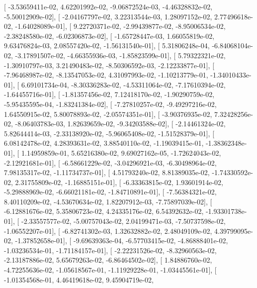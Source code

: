 \documentclass{article}
\begin{document}
       [ -3.53659411e-02,   4.62201992e-02,  -9.06872524e-03,
         -4.46328832e-02,  -5.50012909e-02],
       [ -2.04167797e-02,   3.22313544e-03,   1.28097152e-02,
          2.77496618e-02,  -1.64028089e-01],
       [  9.22720371e-02,  -2.99439877e-02,  -8.95006534e-02,
         -2.38248580e-02,  -6.02306873e-02],
       [ -1.65728447e-03,   1.66055819e-02,   9.63476824e-03,
          2.08557420e-02,  -1.56131540e-01],
       [  5.31806248e-04,  -6.84068104e-02,  -3.17891507e-02,
         -4.66355936e-03,  -1.85823599e-01],
       [  5.79322321e-02,  -1.30910797e-03,   3.21490483e-02,
         -8.50306592e-03,  -2.12233877e-01],
       [ -7.96468987e-02,  -8.13547053e-02,   4.31097993e-02,
         -1.10213779e-01,  -1.34010433e-01],
       [  6.69101734e-04,  -8.30336283e-02,  -4.53311064e-02,
         -7.17610394e-02,  -1.64455716e-01],
       [ -1.81357456e-02,   7.12418170e-02,  -1.90290759e-02,
         -5.95435595e-04,  -1.83241384e-02],
       [ -7.27810257e-02,  -9.49297216e-02,   1.64550915e-02,
          5.80078893e-02,  -2.05574351e-01],
       [ -3.90376935e-02,   7.32428256e-02,  -8.06403783e-03,
          1.82639659e-02,  -9.34203588e-02],
       [ -2.14461324e-02,   5.82644414e-03,  -2.33138920e-02,
         -5.96065408e-02,  -1.51528379e-01],
       [  6.08142478e-02,   4.28393631e-02,   3.88540110e-02,
         -1.19039415e-01,  -1.38362348e-01],
       [  1.14959859e-01,   5.65216380e-02,   9.69027162e-05,
         -1.72624043e-02,  -2.12921681e-01],
       [ -6.58661229e-02,  -3.04296921e-03,  -6.30498964e-02,
          7.98135317e-02,  -1.11734737e-01],
       [  4.51793240e-02,   8.81389035e-02,  -1.74330592e-02,
          2.31755809e-02,  -1.16885151e-01],
       [ -6.33363815e-02,   1.93601914e-02,  -5.29888969e-02,
         -6.66021181e-02,  -1.84710891e-01],
       [ -7.56384321e-02,   8.40110209e-02,  -4.53670634e-02,
          1.82207912e-03,  -7.75897039e-02],
       [ -6.12881676e-02,   5.35806723e-02,   4.24335176e-02,
          6.54392632e-02,  -1.93301738e-01],
       [ -2.33557577e-02,  -5.00757043e-02,   2.04199471e-03,
         -7.50737598e-02,  -1.06552207e-01],
       [ -6.82741302e-03,   1.32632882e-02,   2.48049109e-02,
          4.39799095e-02,  -1.37852658e-01],
       [ -9.69639363e-04,  -6.57703415e-02,  -4.86888401e-02,
         -1.03236534e-01,  -1.71184157e-01],
       [ -2.22231526e-02,  -8.32960563e-02,  -2.13187886e-02,
          5.65679263e-02,  -6.86464502e-02],
       [  1.84886760e-02,  -4.72255636e-02,  -1.05618567e-01,
         -1.11929228e-01,  -1.03445561e-01],
       [ -1.01354568e-01,   4.46419618e-02,   9.45904719e-02,
\end{document}
